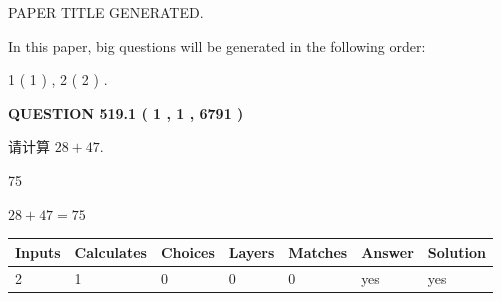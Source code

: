 \documentclass{ctexart}
\begin{document}
   
 \vspace{0.2in}
 
 
 
 
   
   
 PAPER TITLE GENERATED.
   
   
   
\vspace{0.2in}
   
In this paper, big questions will be generated in the following order: 
   
   
   1 ( 1 )
 ,
   2 ( 2 )
 .
  
\vspace{0.2in}
  
{\textbf{\Large{QUESTION
519.1 
 ( 1 , 1 , 6791 )
}}}
  
  
 
请计算 $ %
28 +  %
47 $.
 
 
 
\noindent{}
 
 

75
 
 
\noindent{}
 
 

 
 
 
\noindent{}
 
 

$ %
28 +  %
47=   %
75$
 
 
\noindent{}
 
 

 
   
   
   
   
\noindent\begin{tabular}{|l|l|l|l|l|l|l|}
 \hline
Inputs & Calculates & Choices & Layers & Matches & Answer & Solution \\ \hline
 2  & 
 1  & 
 0
  & 
 0  & 
 0  & 
  yes & 
  yes 
  \\ \hline
 \end{tabular}
   
   
   
   
\noindent{}
   
   
  
\end{document}
